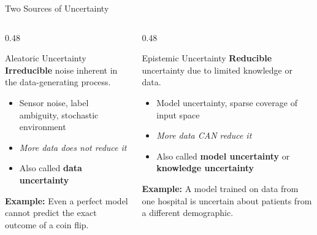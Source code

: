 \documentclass[aspectratio=169]{beamer}
\begin{document}
\begin{frame}{Two Sources of Uncertainty}

  \begin{columns}[T]
    \begin{column}{0.48\textwidth}
      \begin{block}{Aleatoric Uncertainty}
        \textbf{Irreducible} noise inherent in the data-generating process.\\[0.5em]
        \begin{itemize}
          \item Sensor noise, label ambiguity, stochastic environment
          \item \emph{More data does not reduce it}
          \item Also called \textbf{data uncertainty}
        \end{itemize}
        \vspace{0.5em}
        \textbf{Example:} Even a perfect model cannot predict the exact outcome of a coin flip.
      \end{block}
    \end{column}
    \begin{column}{0.48\textwidth}
      \begin{block}{Epistemic Uncertainty}
        \textbf{Reducible} uncertainty due to limited knowledge or data.\\[0.5em]
        \begin{itemize}
          \item Model uncertainty, sparse coverage of input space
          \item \emph{More data CAN reduce it}
          \item Also called \textbf{model uncertainty} or \textbf{knowledge uncertainty}
        \end{itemize}
        \vspace{0.5em}
        \textbf{Example:} A model trained on data from one hospital is uncertain about patients from a different demographic.
      \end{block}
    \end{column}
  \end{columns}

\end{frame}
\end{document}
